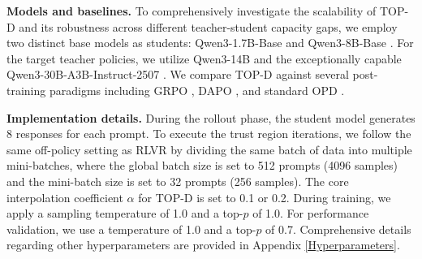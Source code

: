 \documentclass{article}
\theoremstyle{plain}
\theoremstyle{definition}
\theoremstyle{remark}
\begin{document}
\textbf{Models and baselines.} To comprehensively investigate the scalability of TOP-D and its robustness across different teacher-student capacity gaps, we employ two distinct base models as students: Qwen3-1.7B-Base \citep{yang2025qwen3} and Qwen3-8B-Base \citep{yang2025qwen3}. For the target teacher policies, we utilize Qwen3-14B \citep{yang2025qwen3} and the exceptionally capable Qwen3-30B-A3B-Instruct-2507 \citep{yang2025qwen3}. We compare TOP-D against several post-training paradigms including GRPO \citep{shao2024deepseekmath}, DAPO \citep{yu2025dapo}, and standard OPD \citep{lu2025onpolicydistillation}.

\textbf{Implementation details.} During the rollout phase, the student model generates 8 responses for each prompt. To execute the trust region iterations, we follow the same off-policy setting as RLVR by dividing the same batch of data into multiple mini-batches, where the global batch size is set to 512 prompts (4096 samples) and the mini-batch size is set to 32 prompts (256 samples). The core interpolation coefficient $\alpha$ for TOP-D is set to 0.1 or 0.2. During training, we apply a sampling temperature of 1.0 and a top-$p$ of 1.0. For performance validation, we use a temperature of 1.0 and a top-$p$ of 0.7. Comprehensive details regarding other hyperparameters are provided in Appendix \ref{Hyperparameters}.
\end{document}
